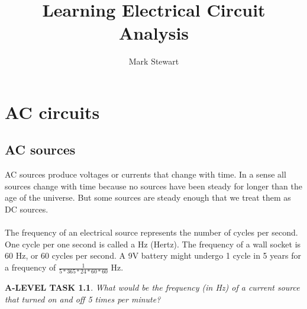 \documentclass{book}
\numberwithin{equation}{section}
\newtheorem{alevel}{A-LEVEL TASK}
\theoremstyle{definition}
\begin{document}
\title{Learning Electrical Circuit Analysis}
\author{Mark Stewart}
\maketitle
\tableofcontents









\chapter{AC circuits}

\section{AC sources}
AC sources produce voltages or currents that change with time. In a sense all sources change with time because no sources have been steady for longer than the age of the universe. But some sources are steady enough that we treat them as DC sources.\\
\\
The frequency of an electrical source represents the number of cycles per second. One cycle per one second is called a Hz (Hertz). The frequency of a wall socket is 60 Hz, or 60 cycles per second. A 9V battery might undergo 1 cycle in 5 years for a frequency of $\frac{1}{5*365*24*60*60}$ Hz. \\

\begin{alevel}
What would be the frequency (in Hz) of a current source that turned on and off 5 times per minute?
\end{alevel}
\end{document}
